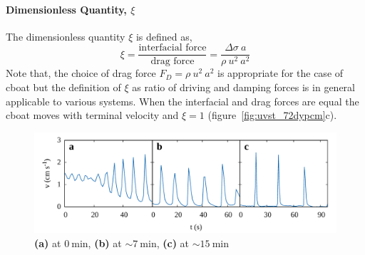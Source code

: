 \documentclass[journal=langd5, manuscript=article, layout=twocolumn]{achemso}
\begin{document}
\paragraph{Dimensionless Quantity, $\xi$}
The dimensionless quantity $\xi$ is defined as,
\begin{equation}
\xi = \frac{\text{interfacial force}}{\text{drag force}} = \frac{\Delta\sigma\ a}{\rho\ u^{2}\ a^{2}}
\end{equation}
Note that, the choice of drag force $F_{D} = \rho\ u^{2}\ a^{2}$ is appropriate for the case of cboat but the definition of $\xi$ as ratio of driving and damping forces is in general applicable to various systems. When the interfacial and drag forces are equal the cboat moves with terminal velocity and $\xi = 1$ (figure~\ref{fig:uvst_72dypcm}c).
\begin{figure}[ht]
	\centering
	\includegraphics[width=\textwidth]{uvst_65dypcm.pdf}
	\caption{{\bf (a)} at $ 0\ \mathrm{min}$, {\bf (b)} at $\sim 7\ \mathrm{min}$, {\bf (c)} at $\sim 15\ \mathrm{min}$}
\label{fig:uvst_65dypcm}
\end{figure}
\end{document}
